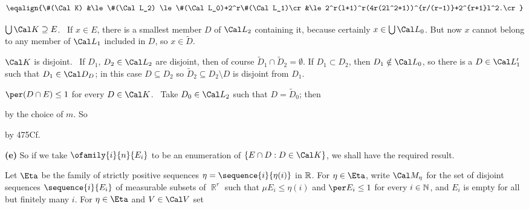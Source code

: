 {


\medskip


$$\eqalign{\#(\Cal K)
&\le\#(\Cal L_2)
\le\#(\Cal L_0)+2^r\#(\Cal L_1)\cr
&\le 2^r(l+1)^r(4r(2l^2+1))^{r/(r-1)}+2^{r+1}l^2.\cr}$$

\medskip

 $\bigcup\Cal K\supseteq E$.   \Prf\ If $x\in E$, there
is a smallest member $D$ of $\Cal L_2$ containing it, because
certainly $x\in\bigcup\Cal L_0$.   But now $x$ cannot belong to any
member of $\Cal L_1$ included in $D$, so $x\in\tilde D$.\ \Qed

\medskip

 $\Cal K$ is disjoint.   \Prf\ If $D_1$, $D_2\in\Cal L_2$
are disjoint, then of course $\tilde D_1\cap\tilde D_2=\emptyset$.   If
$D_1\subset D_2$, then $D_1\notin\Cal L_0$, so there is a $D\in\Cal L'_1$
such that $D_1\in\Cal D_D$;  in this case $D\subseteq D_2$ so
$\tilde D_2\subseteq D_2\setminus D$ is disjoint from $D_1$.\ \Qed

\medskip

 $\per(D\cap E)\le 1$ for every $D\in\Cal K$.
\Prf\ Take $D_0\in\Cal L_2$ such that $D=\tilde D_0$;  then


\noindent by the choice of $m$.   So


\noindent by 475Cf.\ \Qed

\medskip

{\bf (e)} So if we take $\ofamily{i}{n}{E_i}$ to be an enumeration of
$\{E\cap D:D\in\Cal K\}$, we shall have the required result.
}%

   Let $\Eta$ be the
family of strictly positive
sequences $\eta=\sequence{i}{\eta(i)}$ in $\Bbb R$.   For $\eta\in\Eta$,
write $\Cal M_{\eta}$ for the set of disjoint sequences
$\sequence{i}{E_i}$ of measurable subsets of $\BbbR^r$ such that
$\mu E_i\le\eta(i)$ and $\per E_i\le 1$ for every
$i\in\Bbb N$, and $E_i$ is empty for all but finitely many $i$.
For $\eta\in\Eta$ and $V\in\Cal V$ set

